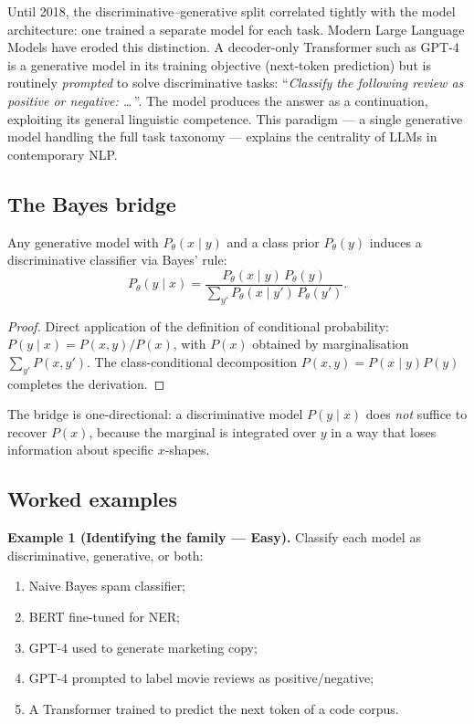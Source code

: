 \begin{remark}
Until 2018, the discriminative--generative split correlated tightly with the model architecture: one trained a separate model for each task. Modern Large Language Models have eroded this distinction. A decoder-only Transformer such as GPT-4 is a generative model in its training objective (next-token prediction) but is routinely \emph{prompted} to solve discriminative tasks: ``\emph{Classify the following review as positive or negative: \dots\,}''. The model produces the answer as a continuation, exploiting its general linguistic competence. This paradigm --- a single generative model handling the full task taxonomy --- explains the centrality of LLMs in contemporary NLP.
\end{remark}

\subsection{The Bayes bridge}

\begin{proposition}
Any generative model with $P_\theta(x \mid y)$ and a class prior $P_\theta(y)$ induces a discriminative classifier via Bayes' rule:
\[ P_\theta(y \mid x) = \frac{P_\theta(x \mid y)\, P_\theta(y)}{\sum_{y'} P_\theta(x \mid y')\, P_\theta(y')}. \]
\end{proposition}

\begin{proof}
Direct application of the definition of conditional probability: $P(y \mid x) = P(x, y) / P(x)$, with $P(x)$ obtained by marginalisation $\sum_{y'} P(x, y')$. The class-conditional decomposition $P(x, y) = P(x \mid y) P(y)$ completes the derivation.
\end{proof}

\begin{remark}
The bridge is one-directional: a discriminative model $P(y \mid x)$ does \emph{not} suffice to recover $P(x)$, because the marginal is integrated over $y$ in a way that loses information about specific $x$-shapes.
\end{remark}

\subsection{Worked examples}

\textbf{Example 1 (Identifying the family --- Easy).}
Classify each model as discriminative, generative, or both:
\begin{enumerate}
    \item Naive Bayes spam classifier;
    \item BERT fine-tuned for NER;
    \item GPT-4 used to generate marketing copy;
    \item GPT-4 prompted to label movie reviews as positive/negative;
    \item A Transformer trained to predict the next token of a code corpus.
\end{enumerate}


